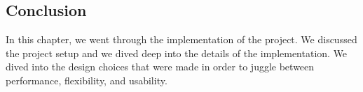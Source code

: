 \begin{spacing}{1.2}
    \section*{Conclusion}
    In this chapter, we went through the implementation of the project. We discussed the 
    project setup and we dived deep into the details of the implementation. We dived into
    the design choices that were made in order to juggle between performance, flexibility, 
    and usability. 

\end{spacing}
